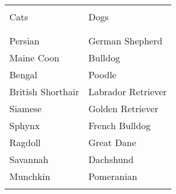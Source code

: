 


\begin{tabularx}{0.6\textwidth}{YY} \\
\toprule \\
 Cats & Dogs  \\ \\
\midrule \\
Persian & German Shepherd  \\ 
Maine Coon & Bulldog  \\ 
Bengal & Poodle  \\ 
British Shorthair & Labrador Retriever  \\ 
Siamese & Golden Retriever  \\ 
Sphynx & French Bulldog  \\ 
Ragdoll & Great Dane  \\ 
Savannah & Dachshund  \\ 
Munchkin & Pomeranian  \\ 

\bottomrule \\
\end{tabularx} 




